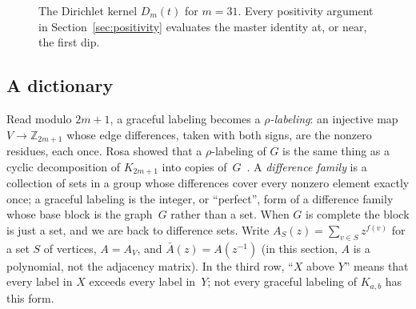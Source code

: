 \documentclass[11pt]{amsart}
\theoremstyle{tplain}
\theoremstyle{tdefinition}
\theoremstyle{tremark}
\newcommand{\ZZ}{\mathbb Z}
\begin{document}
\begin{figure}[ht]
\centering
{}
\caption{The Dirichlet kernel $D_m(t)$ for $m=31$. Every positivity argument in
Section~\ref{sec:positivity} evaluates the master identity at, or near, the
first dip.}
\label{fig:kernel}
\end{figure}

\subsection{A dictionary}\label{sec:dictionary}
Read modulo $2m+1$, a graceful labeling becomes a \emph{$\rho$-labeling}: an
injective map $V\to\ZZ_{2m+1}$ whose edge differences, taken with both signs,
are the nonzero residues, each once. Rosa
showed that a $\rho$-labeling of $G$ is the same thing as a cyclic
decomposition of $K_{2m+1}$ into copies of~$G$~\cite{rosa}. A \emph{difference
family} is a collection of sets in a group whose differences cover every
nonzero element exactly once; a graceful labeling is the integer, or
``perfect'', form of a difference family whose base block is the graph~$G$
rather than a set. When $G$ is complete the block is just a set, and we are
back to difference sets.  Write $A_S(z)=\sum_{v\in S}z^{f(v)}$ for
a set $S$ of vertices, $A=A_V$, and $\bar A(z)=A(z^{-1})$ (in this section, $A$ is a polynomial, not the adjacency matrix). In the third row, ``$X$
above $Y$'' means that every label in $X$ exceeds every label in~$Y$; not
every graceful labeling of $K_{a,b}$ has this form.
\end{document}
